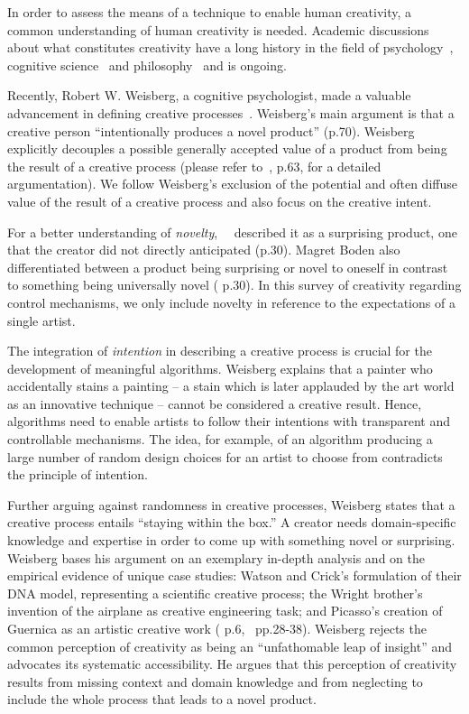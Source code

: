In order to assess the means of a technique to enable human creativity, a common understanding of human creativity is needed. Academic discussions about what constitutes creativity have a long history in the field of psychology~\cite{weisberg_2006_cui}, cognitive science~\cite{boden_2004_cmm} and philosophy~\cite{gaut_2010_pc} and is ongoing. 

Recently, Robert W. Weisberg, a cognitive psychologist, made a valuable advancement in defining creative processes~\cite{weisberg_2006_cui}. Weisberg's main argument is that a creative person ``intentionally produces a novel product'' (p.70). Weisberg explicitly decouples a possible generally accepted value of a product from being the result of a creative process (please refer to~\cite{weisberg_2006_cui}, p.63, for a detailed argumentation). We follow Weisberg's exclusion of the potential and often diffuse value of the result of a creative process and also focus on the creative intent. 

For a better understanding of \textit{novelty},~\citeauthor*{boden_2010_cat}~\cite{boden_2010_cat} described it as a surprising product, one that the creator did not directly anticipated (p.30). Magret Boden also differentiated between a product being surprising or novel to oneself in contrast to something being universally novel (\cite{boden_2010_cat} p.30). In this survey of creativity regarding control mechanisms, we only include novelty in reference to the expectations of a single artist.

The integration of \textit{intention} in describing a creative process is crucial for the development of meaningful algorithms. Weisberg explains that a painter who accidentally stains a painting – a stain which is later applauded by the art world as an innovative technique – cannot be considered a creative result. Hence, algorithms need to enable artists to follow their intentions with transparent and controllable mechanisms. The idea, for example, of an algorithm producing a large number of random design choices for an artist to choose from contradicts the principle of intention.

Further arguing against randomness in creative processes, Weisberg states that a creative process entails ``staying within the box.'' A creator needs domain-specific knowledge and expertise in order to come up with something novel or surprising. Weisberg bases his argument on an exemplary in-depth analysis and on the empirical evidence of unique case studies: Watson and Crick's formulation of their DNA model, representing a scientific creative process; the Wright brother's invention of the airplane as creative engineering task; and Picasso's creation of Guernica as an artistic creative work (\cite{weisberg_2006_cui} p.6,~\cite{markman_2009_tis} pp.28-38). Weisberg rejects the common perception of creativity as being an ``unfathomable leap of insight'' and advocates its systematic accessibility. He argues that this perception of creativity results from missing context and domain knowledge and from neglecting to include the whole process that leads to a novel product.


